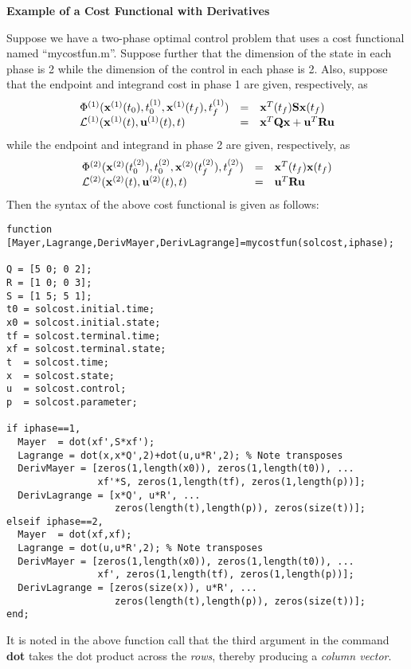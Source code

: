 \documentclass[10pt,final]{report}
\newenvironment{shadedframe}{%
  \def\FrameCommand{\fcolorbox{black}{shadecolor}}%
  \MakeFramed {\FrameRestore}}
{\endMakeFramed}
\begin{document}
\begin{shadedframe}
{\noindent}{\bf Example of a Cost Functional with Derivatives}
\vspace{12pt}

Suppose we have a two-phase optimal control problem that uses a cost
functional named ``mycostfun.m''.  Suppose further that the dimension of the
state in each phase is 2 while the dimension of the control in each phase is
2.  Also, suppose that the endpoint and integrand cost in phase 1 are
given, respectively, as
\begin{displaymath}
  \begin{array}{lcl}
    \Phi^{(1)}(\mathbf{x}^{(1)}(t_0),t_0^{(1)},\mathbf{x}^{(1)}(t_f),t_f^{(1)}) & = & \mathbf{x}^T(t_f)\mathbf{S}\mathbf{x}(t_f) \\
    \mathcal{L}^{(1)}(\mathbf{x}^{(1)}(t),\mathbf{u}^{(1)}(t),t) & = & \mathbf{x}^T\mathbf{Q}\mathbf{x} + \mathbf{u}^T\mathbf{R}\mathbf{u}
  \end{array}
\end{displaymath}
while the endpoint and integrand in phase 2 are given, respectively, as
\begin{displaymath}
  \begin{array}{lcl}
    \Phi^{(2)}(\mathbf{x}^{(2)}(t_0^{(2)}),t_0^{(2)},\mathbf{x}^{(2)}(t_f^{(2)}),t_f^{(2)}) & = & \mathbf{x}^T(t_f)\mathbf{x}(t_f) \\
    \mathcal{L}^{(2)}(\mathbf{x}^{(2)}(t),\mathbf{u}^{(2)}(t),t) & = & \mathbf{u}^T\mathbf{R}\mathbf{u}
  \end{array}
\end{displaymath}
Then the syntax of the above cost functional is given as follows:
\begin{verbatim}
function [Mayer,Lagrange,DerivMayer,DerivLagrange]=mycostfun(solcost,iphase);

Q = [5 0; 0 2];
R = [1 0; 0 3];
S = [1 5; 5 1];
t0 = solcost.initial.time;
x0 = solcost.initial.state;
tf = solcost.terminal.time;
xf = solcost.terminal.state;
t  = solcost.time;
x  = solcost.state;
u  = solcost.control;
p  = solcost.parameter;

if iphase==1,
  Mayer  = dot(xf',S*xf');
  Lagrange = dot(x,x*Q',2)+dot(u,u*R',2); % Note transposes
  DerivMayer = [zeros(1,length(x0)), zeros(1,length(t0)), ...
                xf'*S, zeros(1,length(tf), zeros(1,length(p))];
  DerivLagrange = [x*Q', u*R', ...
                   zeros(length(t),length(p)), zeros(size(t))];
elseif iphase==2,
  Mayer  = dot(xf,xf);
  Lagrange = dot(u,u*R',2); % Note transposes
  DerivMayer = [zeros(1,length(x0)), zeros(1,length(t0)), ...
                xf', zeros(1,length(tf), zeros(1,length(p))];
  DerivLagrange = [zeros(size(x)), u*R', ...
                   zeros(length(t),length(p)), zeros(size(t))];
end;
\end{verbatim}
It is noted in the above function call that the third argument in the
command {\bf dot} takes the dot product across the {\em rows}, thereby
producing a {\em column vector}.

\end{shadedframe}
\end{document}
